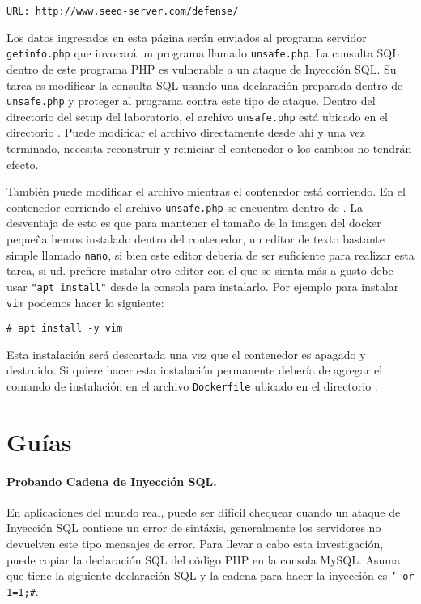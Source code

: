 \begin{lstlisting}
URL: http://www.seed-server.com/defense/
\end{lstlisting}

Los datos ingresados en esta página serán enviados al programa servidor \texttt{getinfo.php} que invocará un programa llamado \texttt{unsafe.php}.
La consulta SQL dentro de este programa PHP es vulnerable a un ataque de Inyección SQL. Su tarea es modificar la consulta SQL usando una declaración preparada dentro de \texttt{unsafe.php} y proteger al programa contra este tipo de ataque.
Dentro del directorio del setup del laboratorio, el archivo \texttt{unsafe.php} está ubicado en el directorio . Puede modificar el archivo directamente desde ahí y una vez terminado, necesita reconstruir y reiniciar el contenedor o los cambios no tendrán efecto.

También puede modificar el archivo mientras el contenedor está corriendo.
En el contenedor corriendo el archivo \texttt{unsafe.php} se encuentra dentro de .
La desventaja de esto es que para mantener el tamaño de la imagen del docker pequeña hemos instalado dentro del contenedor, un editor de texto bastante simple llamado \texttt{nano}, si bien este editor debería de ser suficiente para realizar esta tarea, si ud. prefiere instalar otro editor con el que se sienta más a gusto debe usar \texttt{"apt install"} desde la consola para instalarlo. Por ejemplo para instalar \texttt{vim} podemos hacer lo siguiente:

\begin{lstlisting}
# apt install -y vim 
\end{lstlisting}

Esta instalación será descartada una vez que el contenedor es apagado y destruido.
Si quiere hacer esta instalación permanente debería de agregar el comando de instalación en el archivo \texttt{Dockerfile} ubicado en el directorio  . 


\section{Guías}
\label{sec:guidelines}

\paragraph{Probando Cadena de Inyección SQL.}
En aplicaciones del mundo real, puede ser difícil chequear cuando un ataque de Inyección SQL contiene un error de sintáxis, generalmente los servidores no devuelven este tipo mensajes de error.
Para llevar a cabo esta investigación, puede copiar la declaración SQL del código PHP en la consola MySQL. Asuma que tiene la siguiente declaración SQL y la cadena para hacer la inyección es {\tt ' or 1=1;\#}. 

